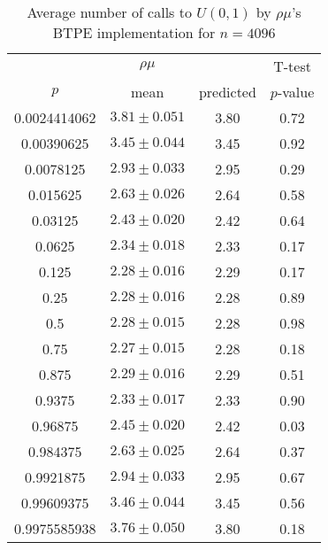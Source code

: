 \begin{table}[t]
\caption{Average number of calls to $U(0,1)$ by $\rho\mu$'s BTPE implementation for $n=4096$}
\label{tab:calls4096}
\begin{tabular}{cccc} \hline
    & $\rho\mu$ & & T-test \\
$p$ & mean & predicted & $p$-value \\ \hline
0.0024414062 & $3.81 \pm 0.051$ & 3.80 & 0.72 \\
0.00390625   & $3.45 \pm 0.044$ & 3.45 & 0.92 \\
0.0078125    & $2.93 \pm 0.033$ & 2.95 & 0.29 \\
0.015625     & $2.63 \pm 0.026$ & 2.64 & 0.58 \\
0.03125      & $2.43 \pm 0.020$ & 2.42 & 0.64 \\
0.0625       & $2.34 \pm 0.018$ & 2.33 & 0.17 \\
0.125        & $2.28 \pm 0.016$ & 2.29 & 0.17 \\
0.25         & $2.28 \pm 0.016$ & 2.28 & 0.89 \\
0.5          & $2.28 \pm 0.015$ & 2.28 & 0.98 \\
0.75         & $2.27 \pm 0.015$ & 2.28 & 0.18 \\
0.875        & $2.29 \pm 0.016$ & 2.29 & 0.51 \\
0.9375       & $2.33 \pm 0.017$ & 2.33 & 0.90 \\
0.96875      & $2.45 \pm 0.020$ & 2.42 & 0.03 \\
0.984375     & $2.63 \pm 0.025$ & 2.64 & 0.37 \\
0.9921875    & $2.94 \pm 0.033$ & 2.95 & 0.67 \\
0.99609375   & $3.46 \pm 0.044$ & 3.45 & 0.56 \\
0.9975585938 & $3.76 \pm 0.050$ & 3.80 & 0.18 \\
\hline
\end{tabular}
\end{table}

